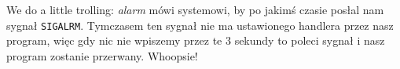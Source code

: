 We do a little trolling: \textit{alarm} mówi systemowi, by po jakimś czasie posłal nam sygnał \texttt{SIGALRM}. Tymczasem ten sygnał nie ma ustawionego handlera przez nasz program, więc gdy nic nie wpiszemy przez te 3 sekundy to poleci sygnał i nasz program zostanie przerwany. Whoopsie!